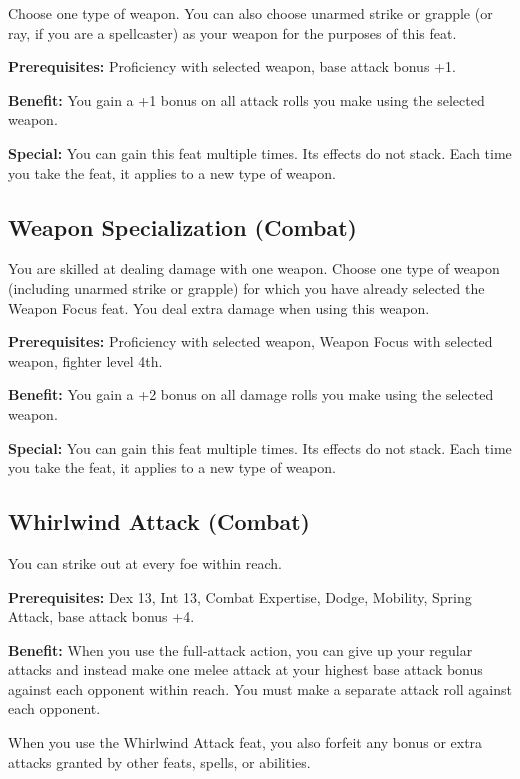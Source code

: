 				
Choose one type of weapon. You can also choose unarmed strike or grapple (or ray, if you are a spellcaster) as your weapon for the purposes of this feat.
				
\textbf{Prerequisites:} Proficiency with selected weapon, base attack bonus +1.
				
\textbf{Benefit:} You gain a +1 bonus on all attack rolls you make using the selected weapon.
				
\textbf{Special:} You can gain this feat multiple times. Its effects do not stack. Each time you take the feat, it applies to a new type of weapon.
				
\subsection{Weapon Specialization (Combat)}

				
You are skilled at dealing damage with one weapon. Choose one type of weapon (including unarmed strike or grapple) for which you have already selected the Weapon Focus feat. You deal extra damage when using this weapon.
				
\textbf{Prerequisites:} Proficiency with selected weapon, Weapon Focus with selected weapon, fighter level 4th.
				
\textbf{Benefit:} You gain a +2 bonus on all damage rolls you make using the selected weapon.
				
\textbf{Special:} You can gain this feat multiple times. Its effects do not stack. Each time you take the feat, it applies to a new type of weapon.
				
\subsection{Whirlwind Attack (Combat)}

				
You can strike out at every foe within reach.
				
\textbf{Prerequisites:} Dex 13, Int 13, Combat Expertise, Dodge, Mobility, Spring Attack, base attack bonus +4.
				
\textbf{Benefit:} When you use the full-attack action, you can give up your regular attacks and instead make one melee attack at your highest base attack bonus against each opponent within reach. You must make a separate attack roll against each opponent.

When you use the Whirlwind Attack feat, you also forfeit any bonus or extra attacks granted by other feats, spells, or abilities.
				

